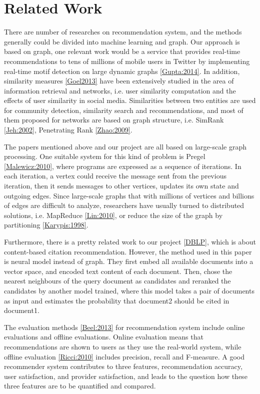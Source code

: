 \section{Related Work}

There are number of researches on recommendation system, and the methods generally could be divided into machine learning and graph. Our approach is based on graph, one relevant work would be 
a service that provides real-time recommendations to tens of millions of mobile users in Twitter by implementing real-time motif detection on large dynamic graphs \ref{Gupta:2014}. In addition, similarity measures \ref{Goel2013} have been extensively studied in the area of information retrieval and networks, i.e. user similarity computation and the effects of user similarity in social media. Similarities between two entities are used for community detection, similarity search and recommendations, and most of them proposed for networks are based on graph structure, i.e. SimRank \ref{Jeh:2002}, Penetrating Rank \ref{Zhao:2009}. 

The papers mentioned above and our project are all based on large-scale graph processing. One suitable system for this kind of problem is Pregel \ref{Malewicz:2010}, where programs are expressed as a sequence of iterations. In each iteration, a vertex could receive the message sent from the previous iteration, then it sends messages to other vertices, updates its own state and outgoing edges. Since large-scale graphs that with millions of vertices and billions of edges are difficult to analyze, researchers have usually turned to distributed solutions, i.e. MapReduce \ref{Lin:2010}, or reduce the size of the graph by partitioning \ref{Karypis:1998}.

Furthermore, there is a pretty related work to our project \ref{DBLP}, which is about content-based citation recommendation. However, the method used in this paper is neural model instead of graph. They first embed all available documents into a vector space, and encoded text content of each document. Then, chose the nearest neighbours of the query document as candidates and reranked the candidates by another model trained, where this model takes a pair of documents as input and estimates the probability that document2 should be cited in document1.

The evaluation methods \ref{Beel:2013} for recommendation system include online evaluations and offline evaluations. Online evaluation means that recommendations are shown to users as they use the real-world system, while offline evaluation \ref{Ricci:2010} includes precision, recall and F-measure. A good recommender system contributes to three features, recommendation accuracy, user satisfaction, and provider satisfaction, and leads to the question how these three features are to be quantified and compared.